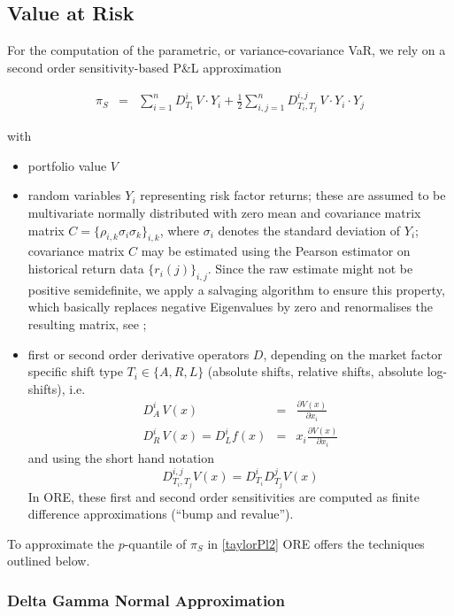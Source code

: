 \documentclass[12pt, a4paper]{article}
\begin{document}
\begin{appendix}
\subsection{Value at Risk}\label{sec:app_var}

For the computation of the parametric, or variance-covariance VaR, we rely on a second order sensitivity-based P\&L approximation

\begin{eqnarray}\label{taylorPl2}
  \pi_S & = & \sum_{i=1}^n D^i_{T_i}\,V\cdot Y_i 
        + \frac{1}{2} \sum_{i,j=1}^n D^{i,j}_{T_i,T_j}\,V\cdot Y_i\cdot Y_j
\end{eqnarray}

with 
\begin{itemize}
\item portfolio value $V$
\item random variables $Y_i$ representing risk factor returns; these are assumed to be multivariate normally distributed with zero mean
and covariance matrix matrix $C = \{ \rho_{i,k} \sigma_i \sigma_k \}_{i,k}$, where $\sigma_i$ denotes the standard
deviation of $Y_i$; covariance matrix $C$ may be estimated using the Pearson estimator on historical return data
$\{ r_i(j) \}_{i,j}$. Since the raw estimate might not be positive semidefinite, we apply a salvaging algorithm to
ensure this property, which basically replaces negative Eigenvalues by zero and renormalises the resulting matrix, see
\cite{corrSalv};
\item first or second order derivative operators $D$, depending
on the market factor specific shift type $T_i \in \{ A,R,L \}$ (absolute shifts, relative shifts, absolute log-shifts), i.e.
\begin{eqnarray*}\label{derivs}
  D^i_A \,V(x) &=& \frac{\partial V(x)}{\partial x_i} \\
  D^i_R \,V(x) = D^i_L f(x) &=& x_i\frac{\partial V(x)}{\partial x_i}
\end{eqnarray*}
and using the short hand notation
\begin{equation*}
  D^{i,j}_{T_i,T_j} V(x) = D^i_{T_i} D^j_{T_j} V(x)
\end{equation*}
In ORE, these first and second order sensitivities are computed as finite difference
approximations (``bump and revalue'').
\end{itemize}

To approximate the $p$-quantile of $\pi_S$ in \eqref{taylorPl2} ORE offers the techniques outlined below.

\subsubsection*{Delta Gamma Normal Approximation}
 

\end{appendix}
\end{document}
